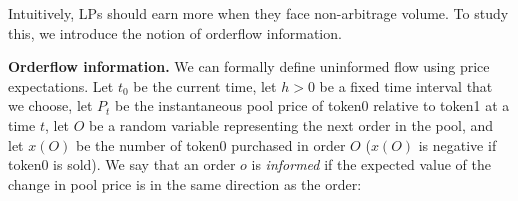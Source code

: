         Intuitively, LPs should earn more when they face non-arbitrage volume. To study this, we introduce the notion of orderflow information.




    \textbf{Orderflow information.}
        We can formally define uninformed flow using price expectations. Let $t_0$ be the current time, let $h>0$ be a fixed time interval that we choose, 
        let $P_{t}$ be the instantaneous pool price
        of token0 relative to token1 at a time $t$,
        let $O$ be a random variable representing the next order in the pool, %
        and let $x(O)$ be the number of token0 purchased in order $O$ ($x(O)$ is negative if token0 is sold). We say that an order $o$ is \textit{informed} if the expected value of the change in pool price is in the same direction as the order:
